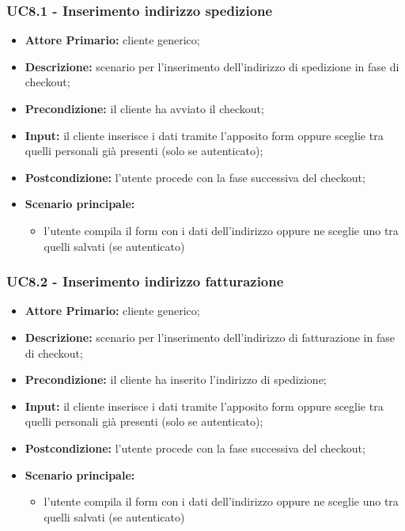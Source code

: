 \subsubsection{UC8.1 - Inserimento indirizzo spedizione}
\label{UC8.1}
\begin{itemize}
    \item \textbf{Attore Primario:} cliente generico;
    \item \textbf{Descrizione:} scenario per l'inserimento dell'indirizzo di spedizione in fase di checkout;
    \item \textbf{Precondizione:} il cliente ha avviato il checkout;
    \item \textbf{Input:} il cliente inserisce i dati tramite l'apposito form oppure sceglie tra quelli personali già presenti (solo se autenticato);
    \item \textbf{Postcondizione:} l'utente procede con la fase successiva del checkout;
    \item \textbf{Scenario principale:}
    \begin{itemize}
        \item l'utente compila il form con i dati dell'indirizzo oppure ne sceglie uno tra quelli salvati (se autenticato)
    \end{itemize}
\end{itemize}

\subsubsection{UC8.2 - Inserimento indirizzo fatturazione}
\label{UC8.1}
\begin{itemize}
    \item \textbf{Attore Primario:} cliente generico;
    \item \textbf{Descrizione:} scenario per l'inserimento dell'indirizzo di fatturazione in fase di checkout;
    \item \textbf{Precondizione:} il cliente ha inserito l'indirizzo di spedizione;
    \item \textbf{Input:} il cliente inserisce i dati tramite l'apposito form oppure sceglie tra quelli personali già presenti (solo se autenticato);
    \item \textbf{Postcondizione:} l'utente procede con la fase successiva del checkout;
    \item \textbf{Scenario principale:}
    \begin{itemize}
        \item l'utente compila il form con i dati dell'indirizzo oppure ne sceglie uno tra quelli salvati (se autenticato)
    \end{itemize}
\end{itemize}


